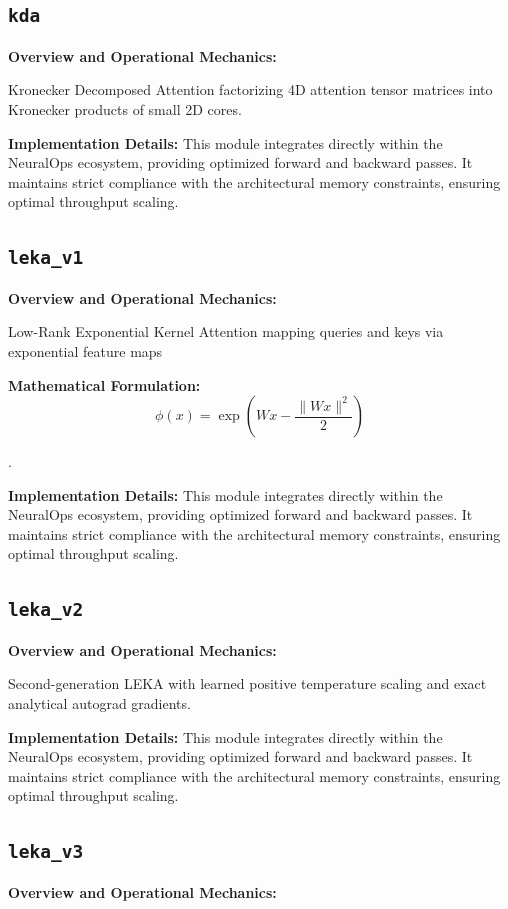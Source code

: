 \documentclass[10pt,twocolumn,letterpaper]{article}
\begin{document}
\subsection{\texttt{kda}}
\textbf{Overview and Operational Mechanics:}

Kronecker Decomposed Attention factorizing 4D attention tensor matrices into Kronecker products of small 2D cores.

\textbf{Implementation Details:}
This module integrates directly within the NeuralOps ecosystem, providing optimized forward and backward passes. It maintains strict compliance with the architectural memory constraints, ensuring optimal throughput scaling.

\subsection{\texttt{leka\_v1}}
\textbf{Overview and Operational Mechanics:}

Low-Rank Exponential Kernel Attention mapping queries and keys via exponential feature maps

\textbf{Mathematical Formulation:}
\begin{equation}
\phi(x) = \exp(W x - \frac{\|Wx\|^2}{2})
\end{equation}

.

\textbf{Implementation Details:}
This module integrates directly within the NeuralOps ecosystem, providing optimized forward and backward passes. It maintains strict compliance with the architectural memory constraints, ensuring optimal throughput scaling.

\subsection{\texttt{leka\_v2}}
\textbf{Overview and Operational Mechanics:}

Second-generation LEKA with learned positive temperature scaling and exact analytical autograd gradients.

\textbf{Implementation Details:}
This module integrates directly within the NeuralOps ecosystem, providing optimized forward and backward passes. It maintains strict compliance with the architectural memory constraints, ensuring optimal throughput scaling.

\subsection{\texttt{leka\_v3}}
\textbf{Overview and Operational Mechanics:}
\end{document}
